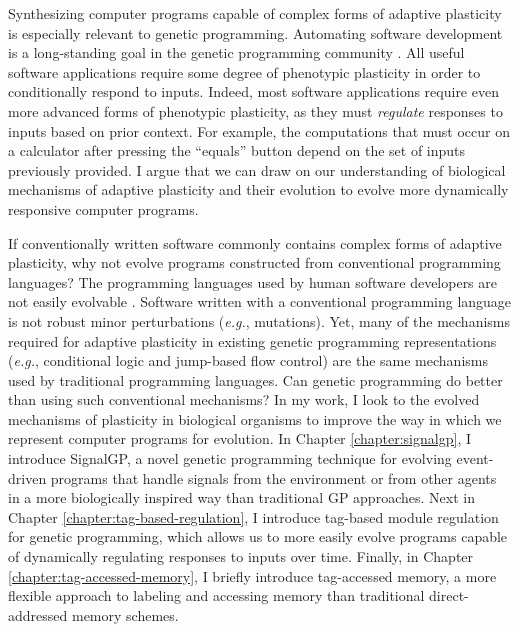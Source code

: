 Synthesizing computer programs capable of complex forms of adaptive plasticity is especially relevant to genetic programming.
Automating software development is a long-standing goal in the genetic programming community \citep{koza_hierarchical_1989,oneill_automatic_2019}.
All useful software applications require some degree of phenotypic plasticity in order to conditionally respond to inputs.
Indeed, most software applications require even more advanced forms of phenotypic plasticity, as they must \textit{regulate} responses to inputs based on prior context.
For example, the computations that must occur on a calculator after pressing the ``equals'' button depend on the set of inputs previously provided.
I argue that we can draw on our understanding of biological mechanisms of adaptive plasticity and their evolution to evolve more dynamically responsive computer programs.

If conventionally written software commonly contains complex forms of adaptive plasticity, why not evolve programs constructed from conventional programming languages?
The programming languages used by human software developers are not easily evolvable \citep{rasmussen_coreworld_1990}.
Software written with a conventional programming language is not robust minor perturbations (\textit{e.g.}, mutations). 
Yet, many of the mechanisms required for adaptive plasticity in existing genetic programming representations (\textit{e.g.}, conditional logic and jump-based flow control) are the same mechanisms used by traditional programming languages. 
Can genetic programming do better than using such conventional mechanisms?
In my work, I look to the evolved mechanisms of plasticity in biological organisms to improve the way in which we represent computer programs for evolution.
In Chapter \ref{chapter:signalgp}, I introduce SignalGP, a novel genetic programming technique for evolving event-driven programs that handle signals from the environment or from other agents in a more biologically inspired way than traditional GP approaches.
Next in Chapter \ref{chapter:tag-based-regulation}, I introduce tag-based module regulation for genetic programming, which allows us to more easily evolve programs capable of dynamically regulating responses to inputs over time.
Finally, in Chapter \ref{chapter:tag-accessed-memory}, I briefly introduce tag-accessed memory, a more flexible approach to labeling and accessing memory than traditional direct-addressed memory schemes.